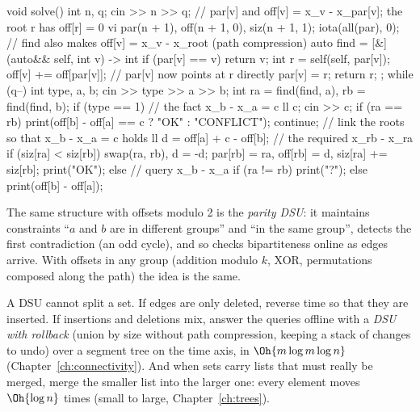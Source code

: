 \begin{code}
void solve() {
    int n, q;
    cin >> n >> q;
    // par[v] and off[v] = x_v - x_par[v]; the root r has off[r] = 0
    vi par(n + 1), off(n + 1, 0), siz(n + 1, 1);
    iota(all(par), 0);
    // find also makes off[v] = x_v - x_root (path compression)
    auto find = [&](auto&& self, int v) -> int {
        if (par[v] == v) return v;
        int r = self(self, par[v]);
        off[v] += off[par[v]];  // par[v] now points at r directly
        par[v] = r;
        return r;
    };
    while (q--) {
        int type, a, b;
        cin >> type >> a >> b;
        int ra = find(find, a), rb = find(find, b);
        if (type == 1) {  // the fact x_b - x_a = c
            ll c;
            cin >> c;
            if (ra == rb) {
                print(off[b] - off[a] == c ? "OK" : "CONFLICT");
                continue;
            }
            // link the roots so that x_b - x_a = c holds
            ll d = off[a] + c - off[b];  // the required x_rb - x_ra
            if (siz[ra] < siz[rb]) swap(ra, rb), d = -d;
            par[rb] = ra, off[rb] = d, siz[ra] += siz[rb];
            print("OK");
        } else {  // query x_b - x_a
            if (ra != rb) print("?");
            else print(off[b] - off[a]);
        }
    }
}
\end{code}

The same structure with offsets modulo 2 is the \emph{parity DSU}: it maintains constraints ``$a$ and $b$ are in different
groups'' and ``in the same group'', detects the first contradiction (an odd cycle), and so checks bipartiteness online as edges
arrive. With offsets in any group (addition modulo $k$, XOR, permutations composed along the path) the idea is the same.

\begin{trick}
A DSU cannot split a set. If edges are only deleted, reverse time so that they are inserted. If insertions and deletions mix,
answer the queries offline with a \emph{DSU with rollback} (union by size without path compression, keeping a stack of changes
to undo) over a segment tree on the time axis, in $\Oh{m \log m \log n}$ (Chapter~\ref{ch:connectivity}). And when sets carry
lists that must really be merged, merge the smaller list into the larger one: every element moves $\Oh{\log n}$ times
(small to large, Chapter~\ref{ch:trees}).
\end{trick}



